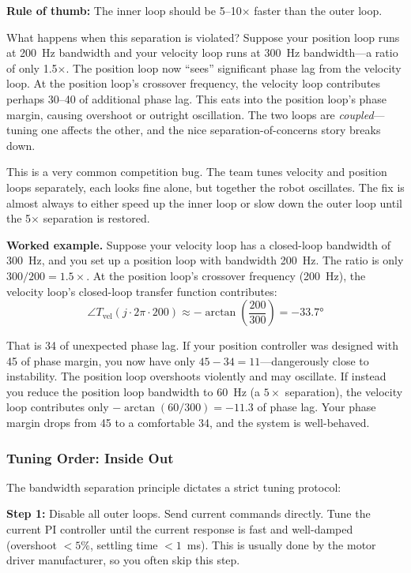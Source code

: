 \textbf{Rule of thumb:} The inner loop should be 5--10$\times$ faster than the outer loop.

What happens when this separation is violated? Suppose your position loop runs at 200~Hz bandwidth and your velocity loop runs at 300~Hz bandwidth---a ratio of only 1.5$\times$. The position loop now ``sees'' significant phase lag from the velocity loop. At the position loop's crossover frequency, the velocity loop contributes perhaps 30--40\textdegree{} of additional phase lag. This eats into the position loop's phase margin, causing overshoot or outright oscillation. The two loops are \textit{coupled}---tuning one affects the other, and the nice separation-of-concerns story breaks down.

This is a very common competition bug. The team tunes velocity and position loops separately, each looks fine alone, but together the robot oscillates. The fix is almost always to either speed up the inner loop or slow down the outer loop until the 5$\times$ separation is restored.

\textbf{Worked example.} Suppose your velocity loop has a closed-loop bandwidth of 300~Hz, and you set up a position loop with bandwidth 200~Hz. The ratio is only $300/200 = 1.5\times$. At the position loop's crossover frequency (200~Hz), the velocity loop's closed-loop transfer function contributes:
\[
\angle T_{\text{vel}}(j \cdot 2\pi \cdot 200) \approx -\arctan\!\left(\frac{200}{300}\right) = -33.7°
\]

That is 34\textdegree{} of unexpected phase lag. If your position controller was designed with 45\textdegree{} of phase margin, you now have only $45 - 34 = 11$\textdegree{}---dangerously close to instability. The position loop overshoots violently and may oscillate. If instead you reduce the position loop bandwidth to 60~Hz (a $5\times$ separation), the velocity loop contributes only $-\arctan(60/300) = -11.3$\textdegree{} of phase lag. Your phase margin drops from 45\textdegree{} to a comfortable 34\textdegree{}, and the system is well-behaved.

\subsubsection{Tuning Order: Inside Out}

The bandwidth separation principle dictates a strict tuning protocol:

\textbf{Step 1:} Disable all outer loops. Send current commands directly. Tune the current PI controller until the current response is fast and well-damped (overshoot $<5\%$, settling time $<1$~ms). This is usually done by the motor driver manufacturer, so you often skip this step.

